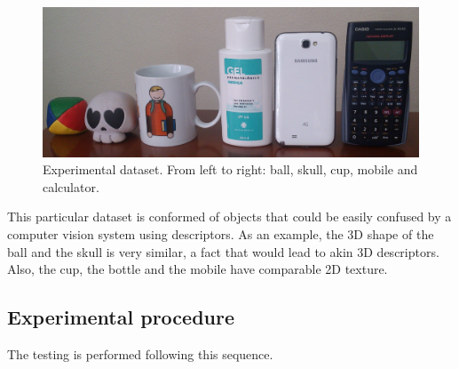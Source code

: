 		\begin{figure}[H]
				\begin{center}
			    \includegraphics[width=\textwidth]{img/tests/dataset02.jpg}
				\caption[Experimental dataset]{Experimental dataset. From left to right: ball, skull, cup, mobile and calculator.}
				\label{dataset}

				\end{center}
		\end{figure}


	
		This particular dataset is conformed of objects that could be easily confused by a computer vision system using descriptors. 
		As an example, the 3D shape of the ball and the skull is very similar, a fact that would lead to akin 3D descriptors. 
		Also, the cup, the bottle and the mobile have comparable 2D texture. 
		\\%

	\subsection{Experimental procedure}
	\label{procedure}

		The testing is performed following this sequence. 

